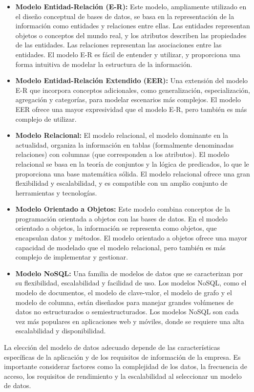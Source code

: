 \begin{itemize}
    \item \textbf{Modelo Entidad-Relación (E-R):} Este modelo, ampliamente utilizado en el diseño conceptual de bases de datos, se basa en la representación de la información como entidades y relaciones entre ellas. Las entidades representan objetos o conceptos del mundo real, y los atributos describen las propiedades de las entidades. Las relaciones representan las asociaciones entre las entidades. El modelo E-R es fácil de entender y utilizar, y proporciona una forma intuitiva de modelar la estructura de la información.
    \item \textbf{Modelo Entidad-Relación Extendido (EER):} Una extensión del modelo E-R que incorpora conceptos adicionales, como generalización, especialización, agregación y categorías, para modelar escenarios más complejos. El modelo EER ofrece una mayor expresividad que el modelo E-R, pero también es más complejo de utilizar.
    \item \textbf{Modelo Relacional:} El modelo relacional, el modelo dominante en la actualidad, organiza la información en tablas (formalmente denominadas relaciones) con columnas (que corresponden a los atributos). El modelo relacional se basa en la teoría de conjuntos y la lógica de predicados, lo que le proporciona una base matemática sólida. El modelo relacional ofrece una gran flexibilidad y escalabilidad, y es compatible con un amplio conjunto de herramientas y tecnologías.
    \item \textbf{Modelo Orientado a Objetos:} Este modelo combina conceptos de la programación orientada a objetos con las bases de datos. En el modelo orientado a objetos, la información se representa como objetos, que encapsulan datos y métodos. El modelo orientado a objetos ofrece una mayor capacidad de modelado que el modelo relacional, pero también es más complejo de implementar y gestionar.
    \item \textbf{Modelo NoSQL:} Una familia de modelos de datos que se caracterizan por su flexibilidad, escalabilidad y facilidad de uso. Los modelos NoSQL, como el modelo de documentos, el modelo de clave-valor, el modelo de grafo y el modelo de columna, están diseñados para manejar grandes volúmenes de datos no estructurados o semiestructurados. Los modelos NoSQL son cada vez más populares en aplicaciones web y móviles, donde se requiere una alta escalabilidad y disponibilidad.
\end{itemize}

La elección del modelo de datos adecuado depende de las características específicas de la aplicación y de los requisitos de información de la empresa. Es importante considerar factores como la complejidad de los datos, la frecuencia de acceso, los requisitos de rendimiento y la escalabilidad al seleccionar un modelo de datos.

